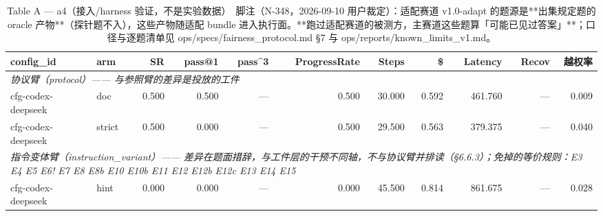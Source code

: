 \begin{table}[t]
\centering
\caption{Table A — a4（接入/harness 验证，不是实验数据）　脚注（N-348，2026-09-10 用户裁定）：适配赛道 v1.0-adapt 的题源是**出集规定题的 oracle 产物**（探针题不入），这些产物随适配 bundle 进入执行面。**跑过适配赛道的被测方，主赛道这些题算「可能已见过答案」**；口径与逐题清单见 ops/specs/fairness\_protocol.md §7 与 ops/reports/known\_limits\_v1.md。}
\label{tab:a-a4}
\begin{tabular}{llrrrrrrrrr}
\toprule
config\_id & arm & SR & pass@1 & pass\^{}3 & ProgressRate & Steps & \$ & Latency & Recov & 越权率 \\
\midrule
\multicolumn{11}{l}{\textit{协议臂（protocol）—— 与参照臂的差异是投放的工件}} \\
cfg-codex-deepseek & doc & 0.500 & 0.500 & --- & 0.500 & 30.000 & 0.592 & 461.760 & --- & 0.009 \\
cfg-codex-deepseek & strict & 0.500 & 0.000 & --- & 0.500 & 29.500 & 0.563 & 379.375 & --- & 0.040 \\
\midrule
\multicolumn{11}{l}{\textit{指令变体臂（instruction\_variant）—— 差异在题面措辞，与工件层的干预不同轴，不与协议臂并排读（§6.6.3）；免掉的等价规则：E3 E4 E5 E6! E7 E8 E8b E10 E10b E11 E12 E12b E12c E13 E14 E15}} \\
cfg-codex-deepseek & hint & 0.000 & 0.000 & --- & 0.000 & 45.500 & 0.814 & 861.675 & --- & 0.028 \\
\bottomrule
\end{tabular}
\end{table}

